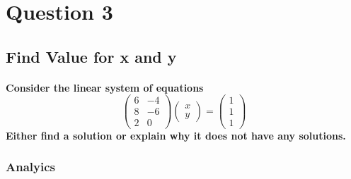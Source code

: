 \section{Question 3}
\subsection{Find Value for x and y}
\paragraph{Consider the linear system of equations
    $$ \begin{pmatrix}
            6 & -4 \\
            8 & -6 \\
            2 & 0
        \end{pmatrix} \begin{pmatrix}
            x \\
            y
        \end{pmatrix} = \begin{pmatrix}
            1 \\
            1 \\
            1
        \end{pmatrix} $$
    Either find a solution or explain why it does not have any solutions.
}
\subsubsection{Analyics}
